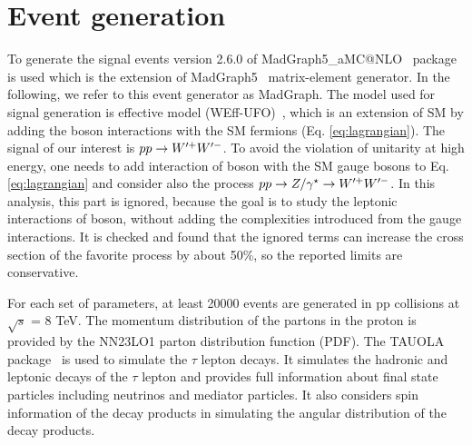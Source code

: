 \section{Event generation}\label{sec:simulation}
To generate the signal events version 2.6.0 of   MadGraph5\_aMC@NLO~\cite{Alwall:2014hca} package is used which is the extension of MadGraph5~\cite{Alwall:2011uj} matrix-element generator. In the following, we refer to this event generator  as MadGraph.
The model used for signal generation is \wprime effective model (WEff-UFO)~\cite{Sullivan:2002jt}, which  is an extension of SM by adding the \wprime boson interactions with the SM fermions (Eq. \ref{eq:lagrangian}). The signal of our interest is $ pp\rightarrow W^{\prime+} W^{\prime-}$. 
To avoid the violation of unitarity at high energy, one needs to add interaction of \wprime boson with the SM gauge bosons to Eq. \ref{eq:lagrangian} and consider also the process $pp\rightarrow Z/\gamma^{\star} \rightarrow W^{\prime+} W^{\prime-}$. In this analysis, this part is ignored, because the goal is to study the leptonic interactions of \wprime boson, without adding the complexities introduced from the gauge interactions. It is checked and found that the ignored terms can increase the cross section of the favorite process by about 50\%, so the reported limits are conservative.

For each set of parameters, at least 20000 events are generated in pp collisions at $\sqrt{s}$ = 8 TeV. 
The momentum distribution of the partons in the proton is provided by the NN23LO1 \cite{Ball:2013hta} parton distribution function (PDF). The TAUOLA package~\cite{Davidson:2010rw} is used to simulate the $\tau$ lepton decays. It simulates the hadronic and leptonic decays of the $\tau$ lepton and provides full information about final state particles including neutrinos and mediator particles. It also considers spin information of the decay products in simulating the angular distribution of the decay products.

